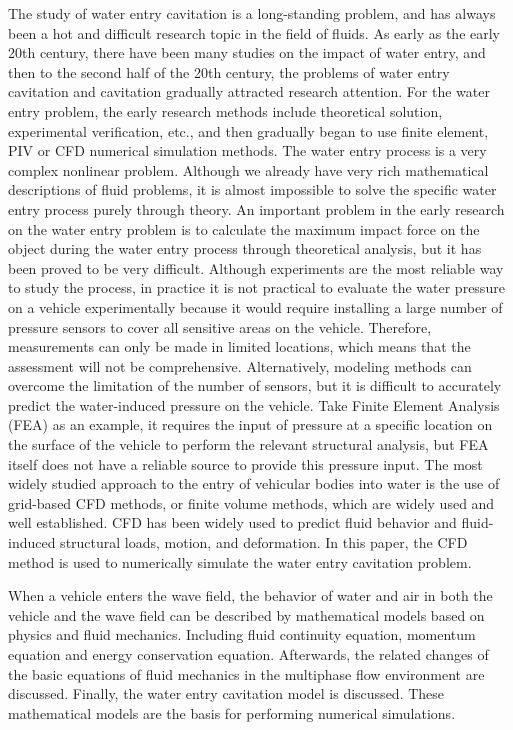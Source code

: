 \begin{digest}
    The study of water entry cavitation is a long-standing problem, and has always been a hot and difficult research topic in the field of fluids. As early as the early 20th century, there have been many studies on the impact of water entry, and then to the second half of the 20th century, the problems of water entry cavitation and cavitation gradually attracted research attention. For the water entry problem, the early research methods include theoretical solution, experimental verification, etc., and then gradually began to use finite element, PIV or CFD numerical simulation methods. The water entry process is a very complex nonlinear problem. Although we already have very rich mathematical descriptions of fluid problems, it is almost impossible to solve the specific water entry process purely through theory. An important problem in the early research on the water entry problem is to calculate the maximum impact force on the object during the water entry process through theoretical analysis, but it has been proved to be very difficult. Although experiments are the most reliable way to study the process, in practice it is not practical to evaluate the water pressure on a vehicle experimentally because it would require installing a large number of pressure sensors to cover all sensitive areas on the vehicle. Therefore, measurements can only be made in limited locations, which means that the assessment will not be comprehensive. Alternatively, modeling methods can overcome the limitation of the number of sensors, but it is difficult to accurately predict the water-induced pressure on the vehicle. Take Finite Element Analysis (FEA) as an example, it requires the input of pressure at a specific location on the surface of the vehicle to perform the relevant structural analysis, but FEA itself does not have a reliable source to provide this pressure input. The most widely studied approach to the entry of vehicular bodies into water is the use of grid-based CFD methods, or finite volume methods, which are widely used and well established. CFD has been widely used to predict fluid behavior and fluid-induced structural loads, motion, and deformation. In this paper, the CFD method is used to numerically simulate the water entry cavitation problem.
  
    When a vehicle enters the wave field, the behavior of water and air in both the vehicle and the wave field can be described by mathematical models based on physics and fluid mechanics. Including fluid continuity equation, momentum equation and energy conservation equation. Afterwards, the related changes of the basic equations of fluid mechanics in the multiphase flow environment are discussed. Finally, the water entry cavitation model is discussed. These mathematical models are the basis for performing numerical simulations.
  

\end{digest}
